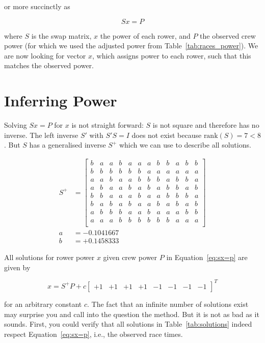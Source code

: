 \documentclass[a4paper,11pt]{article}
\begin{document}
or more succinctly as

\begin{equation}
\label{eq:sx=p}
S x = P
\end{equation}

where $S$ is the swap matrix, $x$ the power of each rower, and $P$ the
observed crew power (for which we used the adjusted power from
Table~\ref{tab:races_power}).  We are now looking for vector $x$, which
assigns power to each rower, such that this matches the observed power.

\section{Inferring Power}

Solving $Sx=P$ for $x$ is not straight forward: $S$ is not square and
therefore has no inverse.  The left inverse $S'$ with $S'S=I$ does not
exist because $\textrm{rank}(S)= 7 < 8$. But $S$ has a generalised
inverse $S^+$ which we can use to describe all solutions.

\begin{align}
  S^+ &= 
  \begin{bmatrix}
  b&a&a&b&a&a&a&b&b&a&b&b\\
  b&b&b&b&b&b&a&a&a&a&a&a\\
  a&a&b&a&a&b&b&b&a&b&b&a\\
  a&b&a&a&b&a&b&a&b&b&a&b\\
  b&b&a&a&a&b&a&a&b&b&b&a\\
  b&a&b&a&b&a&a&b&a&b&a&b\\
  a&b&b&b&a&a&b&a&a&a&b&b\\
  a&a&a&b&b&b&b&b&b&a&a&a\\
\end{bmatrix}\\
 a &= -0.1041667 \\
 b &= +0.1458333
\end{align}


All solutions for rower power $x$ given crew power $P$ in
Equation~\ref{eq:sx=p} are given by

\begin{equation}
  \label{eq:x=sp}
  x = S^+ P + c 
  \begin{bmatrix}
    +1&+1&+1&+1&-1&-1&-1&-1
  \end{bmatrix}^T
\end{equation}

for an arbitrary constant $c$. The fact that an infinite number of
solutions exist may surprise you and call into the question the method.
But it is not as bad as it sounds. First, you could verify that all
solutions in Table~\ref{tab:solutions} indeed respect
Equation~\ref{eq:sx=p}, i.e., the observed race times.
\end{document}
